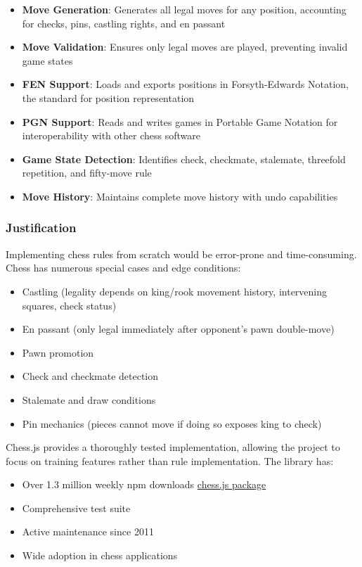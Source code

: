 \begin{itemize}
    \item \textbf{Move Generation}: Generates all legal moves for any position, accounting for checks, pins, castling rights, and en passant
    \item \textbf{Move Validation}: Ensures only legal moves are played, preventing invalid game states
    \item \textbf{FEN Support}: Loads and exports positions in Forsyth-Edwards Notation, the standard for position representation
    \item \textbf{PGN Support}: Reads and writes games in Portable Game Notation for interoperability with other chess software
    \item \textbf{Game State Detection}: Identifies check, checkmate, stalemate, threefold repetition, and fifty-move rule
    \item \textbf{Move History}: Maintains complete move history with undo capabilities
\end{itemize}

\subsubsection*{Justification}

Implementing chess rules from scratch would be error-prone and time-consuming. Chess has numerous special cases and edge conditions:

\begin{itemize}
    \item Castling (legality depends on king/rook movement history, intervening squares, check status)
    \item En passant (only legal immediately after opponent's pawn double-move)
    \item Pawn promotion
    \item Check and checkmate detection
    \item Stalemate and draw conditions
    \item Pin mechanics (pieces cannot move if doing so exposes king to check)
\end{itemize}

Chess.js provides a thoroughly tested implementation, allowing the project to focus on training features rather than rule implementation. The library has:
\begin{itemize}
    \item Over 1.3 million weekly npm downloads \href{https://www.npmjs.com/package/chess.js}{chess.js package}
    \item Comprehensive test suite
    \item Active maintenance since 2011
    \item Wide adoption in chess applications
\end{itemize}

